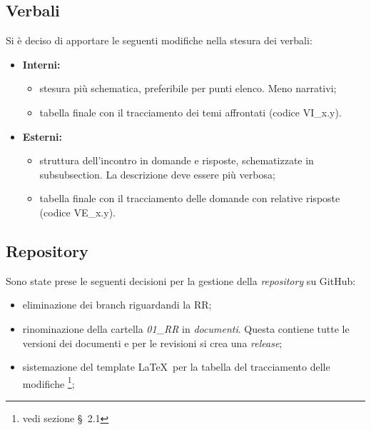 \subsection{Verbali}
Si è deciso di apportare le seguenti modifiche nella stesura dei verbali:
\begin{itemize}
	\item \textbf{Interni:}
	\begin{itemize}
		\item stesura più schematica, preferibile per punti elenco. Meno narrativi;
		\item tabella finale con il tracciamento dei temi affrontati (codice VI\_x.y).
	\end{itemize}
	\item \textbf{Esterni:} 
	\begin{itemize}
		\item struttura dell'incontro in domande e risposte, schematizzate in subsubsection. La descrizione deve essere più verbosa;
		\item tabella finale con il tracciamento delle domande con relative risposte (codice VE\_x.y).
	\end{itemize}
\end{itemize}

\subsection{Repository}
Sono state prese le seguenti decisioni per la gestione della \textit{repository} su GitHub:
\begin{itemize}
	\item eliminazione dei branch riguardandi la RR;
	\item rinominazione della cartella \textit{01\_RR} in \textit{documenti}. Questa contiene tutte le versioni dei documenti e per le revisioni si crea una \textit{release};
	\item sistemazione del template \LaTeX\ per la tabella del tracciamento delle modifiche \footnote{vedi sezione \S\ 2.1};
\end{itemize}
